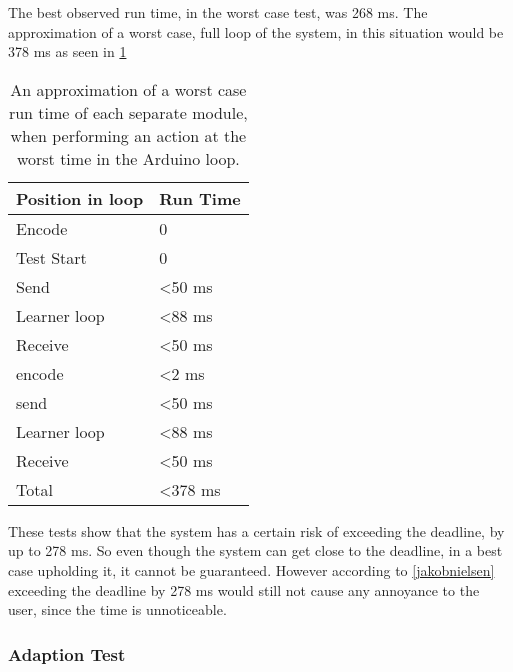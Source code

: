 The best observed run time, in the worst case test, was 268 ms. The approximation of a worst case, full loop of the system, in this situation would be 378 ms as seen in \cref{Table:WorstRunTimeAprox}

\begin{center}
	\begin{table}[htbp]
	  \centering
	  \begin{tabular}{l l}
		\toprule
		Position in loop		& Run Time  \\ \midrule
		Encode 			        & 0  	  	\\ \midrule
		Test Start		        & 0  		\\ \midrule
		Send   			        & <50 ms     \\ \midrule
		Learner loop 	        & <88 ms     \\ \midrule
		Receive 		        & <50 ms     \\ \midrule
		encode 			        & <2 ms      \\ \midrule
		send   			        & <50 ms     \\ \midrule
		Learner loop 	        & <88 ms	    \\ \midrule
		Receive 		        & <50 ms     \\ \midrule \midrule
		Total			        & <378 ms     \\
                                            \bottomrule
	  \end{tabular}
	  \caption{An approximation of a worst case run time of each separate module, when performing an action at the worst time in the Arduino loop.}\label{Table:WorstRunTimeAprox}
	\end{table}
\end{center}

These tests show that the system has a certain risk of exceeding the deadline, by up to 278 ms. So even though the system can get close to the deadline, in a best case upholding it, it cannot be guaranteed. However according to \cref{jakobnielsen} exceeding the deadline by 278 ms would still not cause any annoyance to the user, since the time is unnoticeable.

\subsubsection{Adaption Test}
